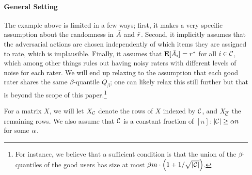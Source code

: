 \paragraph{General Setting}
The example above is limited in a few ways; first, it makes a very specific 
assumption about the randomness in $\tilde{A}$ and $\tilde{r}$. Second, it implicitly 
assumes that the adversarial actions are chosen independently of which items 
they are assigned to rate, which is implausible. Finally, it assumes that 
$\mathbf{E}[\tilde{A}_i] = r^*$ for all $i \in \mathcal{C}$, which among other things rules out 
having noisy raters with different levels of noise for each rater. We will end 
up relaxing to the assumption that each good rater shares the same 
$\beta$-quantile $Q_{\beta}$; one can likely relax this still further but that 
is beyond the scope of this paper.\footnote{For instance, we believe that 
a sufficient condition is that the union of the $\beta$-quantiles of the good 
users has size at most $\beta m \cdot \left( 1 + 1/\sqrt{|\mathcal{C}|} \right)$.}

For a matrix $X$, 
we will let $X_{\mathcal{C}}$ denote the rows of $X$ indexed by $\mathcal{C}$, 
and $X_{\overline{\mathcal{C}}}$ the remaining rows. We also assume that $\mathcal{C}$ is a constant 
fraction of $[n]$: $|\mathcal{C}| \geq \alpha n$ for some $\alpha$.

